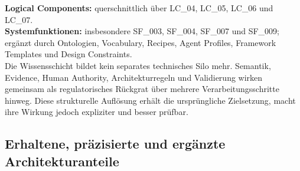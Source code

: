 \begin{tcolorbox}[
  enhanced,
  breakable,
  colback=TuringKnowledge!5,
  colframe=TuringKnowledge,
  title={Wissensschicht: in ein querschnittliches Governance-Netz überführt},
  fonttitle=\bfseries,
  arc=2mm
]
\textbf{Logical Components:} querschnittlich über LC\_04, LC\_05, LC\_06 und LC\_07.\\[1mm]
\textbf{Systemfunktionen:} insbesondere SF\_003, SF\_004, SF\_007 und SF\_009; ergänzt durch Ontologien, Vocabulary, Recipes, Agent Profiles, Framework Templates und Design Constraints.\\[1mm]
Die Wissensschicht bildet kein separates technisches Silo mehr. Semantik, Evidence, Human Authority, Architekturregeln und Validierung wirken gemeinsam als regulatorisches Rückgrat über mehrere Verarbeitungsschritte hinweg. Diese strukturelle Auflösung erhält die ursprüngliche Zielsetzung, macht ihre Wirkung jedoch expliziter und besser prüfbar.
\end{tcolorbox}

\subsection{Erhaltene, präzisierte und ergänzte Architekturanteile}

